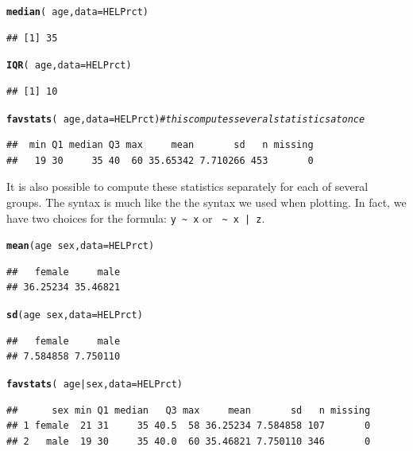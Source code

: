 \documentclass[twoside]{book}\usepackage[]{graphicx}\usepackage[]{xcolor}
\makeatletter
\newcommand{\hlcom}[1]{\textcolor[rgb]{0.678,0.584,0.686}{\textit{#1}}}%
\newcommand{\hlopt}[1]{\textcolor[rgb]{0,0,0}{#1}}%
\newcommand{\hlstd}[1]{\textcolor[rgb]{0.345,0.345,0.345}{#1}}%
\newcommand{\hlkwc}[1]{\textcolor[rgb]{0.333,0.667,0.333}{#1}}%
\newcommand{\hlkwd}[1]{\textcolor[rgb]{0.737,0.353,0.396}{\textbf{#1}}}%
\newenvironment{kframe}{%
 \def\at@end@of@kframe{}%
 \ifinner\ifhmode%
  \def\at@end@of@kframe{\end{minipage}}%
  \begin{minipage}{\columnwidth}%
 \fi\fi%
 \def\FrameCommand##1{\hskip\@totalleftmargin \hskip-\fboxsep
 \colorbox{shadecolor}{##1}\hskip-\fboxsep
     \hskip-\linewidth \hskip-\@totalleftmargin \hskip\columnwidth}%
 \MakeFramed {\advance\hsize-\width
   \@totalleftmargin\z@ \linewidth\hsize
   \@setminipage}}%
 {\par\unskip\endMakeFramed%
 \at@end@of@kframe}
\newenvironment{knitrout}{}{} %
\newcommand{\Rindex}[1]{\index{\texttt{#1}}}
\makeatother
\begin{document}
\Rindex{median()}%
\Rindex{IQR()}%
\Rindex{favstats()}%
\begin{knitrout}
\color{fgcolor}\begin{kframe}
\begin{alltt}
\hlkwd{median}\hlstd{(}\hlopt{~} \hlstd{age,} \hlkwc{data}\hlstd{=HELPrct)}
\end{alltt}
\begin{verbatim}
## [1] 35
\end{verbatim}
\begin{alltt}
\hlkwd{IQR}\hlstd{(}\hlopt{~} \hlstd{age,} \hlkwc{data}\hlstd{=HELPrct)}
\end{alltt}
\begin{verbatim}
## [1] 10
\end{verbatim}
\begin{alltt}
\hlkwd{favstats}\hlstd{(}\hlopt{~} \hlstd{age,} \hlkwc{data}\hlstd{=HELPrct)}  \hlcom{# this computes several statistics at once}
\end{alltt}
\begin{verbatim}
##  min Q1 median Q3 max     mean       sd   n missing
##   19 30     35 40  60 35.65342 7.710266 453       0
\end{verbatim}
\end{kframe}
\end{knitrout}

It is also possible to compute these statistics separately for each of several groups.
The syntax is much like the the syntax we used when plotting.  In fact, we have two 
choices for the formula:  \verb!y ~ x! or \verb! ~ x | z!.

\begin{knitrout}
\color{fgcolor}\begin{kframe}
\begin{alltt}
\hlkwd{mean}\hlstd{(age} \hlopt{~} \hlstd{sex,} \hlkwc{data}\hlstd{=HELPrct)}
\end{alltt}
\begin{verbatim}
##   female     male 
## 36.25234 35.46821
\end{verbatim}
\begin{alltt}
\hlkwd{sd}\hlstd{(age} \hlopt{~} \hlstd{sex,} \hlkwc{data}\hlstd{=HELPrct)}
\end{alltt}
\begin{verbatim}
##   female     male 
## 7.584858 7.750110
\end{verbatim}
\begin{alltt}
\hlkwd{favstats}\hlstd{(} \hlopt{~} \hlstd{age} \hlopt{|} \hlstd{sex,} \hlkwc{data}\hlstd{=HELPrct )}
\end{alltt}
\begin{verbatim}
##      sex min Q1 median   Q3 max     mean       sd   n missing
## 1 female  21 31     35 40.5  58 36.25234 7.584858 107       0
## 2   male  19 30     35 40.0  60 35.46821 7.750110 346       0
\end{verbatim}
\end{kframe}
\end{knitrout}
\end{document}
